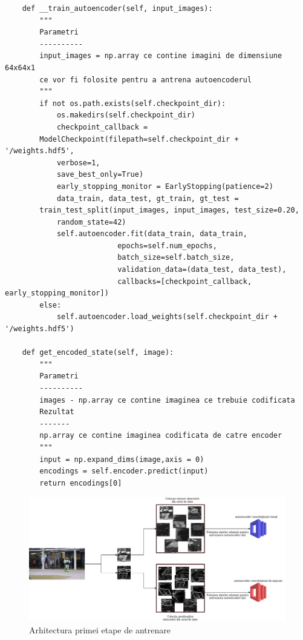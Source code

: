 \documentclass[a4paper,12pt]{report}
\begin{document}
\begin{footnotesize}
\begin{lstlisting}
    def __train_autoencoder(self, input_images):
        """
        Parametri
        ----------
        input_images = np.array ce contine imagini de dimensiune 64x64x1
        ce vor fi folosite pentru a antrena autoencoderul
        """
        if not os.path.exists(self.checkpoint_dir):
            os.makedirs(self.checkpoint_dir)
            checkpoint_callback = 
		ModelCheckpoint(filepath=self.checkpoint_dir + '/weights.hdf5', 
			verbose=1,
			save_best_only=True)
            early_stopping_monitor = EarlyStopping(patience=2)
            data_train, data_test, gt_train, gt_test = 
		train_test_split(input_images, input_images, test_size=0.20,
			random_state=42)
            self.autoencoder.fit(data_train, data_train,
                          epochs=self.num_epochs,
                          batch_size=self.batch_size,
                          validation_data=(data_test, data_test),
                          callbacks=[checkpoint_callback, early_stopping_monitor])
        else:
            self.autoencoder.load_weights(self.checkpoint_dir + '/weights.hdf5')

    def get_encoded_state(self, image):
        """
        Parametri
        ----------
        images - np.array ce contine imaginea ce trebuie codificata 
        Rezultat
        -------
        np.array ce contine imaginea codificata de catre encoder
        """
        input = np.expand_dims(image,axis = 0)
        encodings = self.encoder.predict(input)
        return encodings[0]
\end{lstlisting} \cite{2020autoencoders}
\end{footnotesize}
\begin{figure}[h]
\begin{center}
        \includegraphics[width=1\textwidth]{images/training_stage1_architecture}
			 \caption{Arhitectura primei etape de antrenare}
			 \label{fig:stage1_architecture}
\end{center}
\end{figure}
\end{document}
